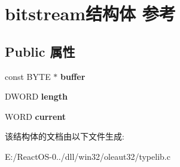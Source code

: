 \hypertarget{structbitstream}{}\section{bitstream结构体 参考}
\label{structbitstream}
\subsection*{Public 属性}
\begin{DoxyCompactItemize}
\item 
\mbox{\label{structbitstream_ab7c067b34cd0053a7ef1912f75a1a31d}} 
const B\+Y\+TE $\ast$ {\bfseries buffer}
\item 
\mbox{\label{structbitstream_ad94e726d05ee1a4b382fbd3e8fcf22f7}} 
D\+W\+O\+RD {\bfseries length}
\item 
\mbox{\label{structbitstream_a4d1427c167e7facd657a537c0a921431}} 
W\+O\+RD {\bfseries current}
\end{DoxyCompactItemize}


该结构体的文档由以下文件生成\+:\begin{DoxyCompactItemize}
\item 
E\+:/\+React\+O\+S-\/0../dll/win32/oleaut32/typelib.\+c\end{DoxyCompactItemize}
